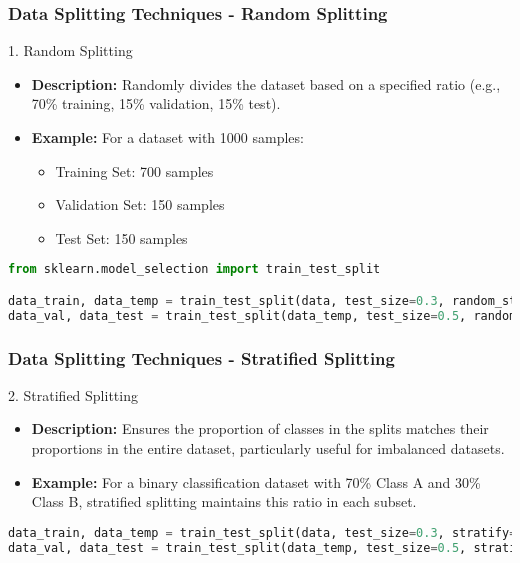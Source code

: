 \documentclass{beamer}
\begin{document}
\begin{frame}[fragile]
    \frametitle{Data Splitting Techniques - Random Splitting}
    \begin{block}{1. Random Splitting}
        \begin{itemize}
            \item \textbf{Description:} Randomly divides the dataset based on a specified ratio (e.g., 70\% training, 15\% validation, 15\% test).
            \item \textbf{Example:} For a dataset with 1000 samples:
            \begin{itemize}
                \item Training Set: 700 samples
                \item Validation Set: 150 samples
                \item Test Set: 150 samples
            \end{itemize}
        \end{itemize}
    \end{block}
    \begin{lstlisting}[language=Python]
from sklearn.model_selection import train_test_split

data_train, data_temp = train_test_split(data, test_size=0.3, random_state=42)  # Splits to training (70%) and temp (30%)
data_val, data_test = train_test_split(data_temp, test_size=0.5, random_state=42)  # Further splits the temp set to validation and test (15% each)
    \end{lstlisting}
\end{frame}

\begin{frame}[fragile]
    \frametitle{Data Splitting Techniques - Stratified Splitting}
    \begin{block}{2. Stratified Splitting}
        \begin{itemize}
            \item \textbf{Description:} Ensures the proportion of classes in the splits matches their proportions in the entire dataset, particularly useful for imbalanced datasets.
            \item \textbf{Example:} For a binary classification dataset with 70\% Class A and 30\% Class B, stratified splitting maintains this ratio in each subset.
        \end{itemize}
    \end{block}
    \begin{lstlisting}[language=Python]
data_train, data_temp = train_test_split(data, test_size=0.3, stratify=data['class'], random_state=42)
data_val, data_test = train_test_split(data_temp, test_size=0.5, stratify=data_temp['class'], random_state=42)
    \end{lstlisting}
\end{frame}
\end{document}
